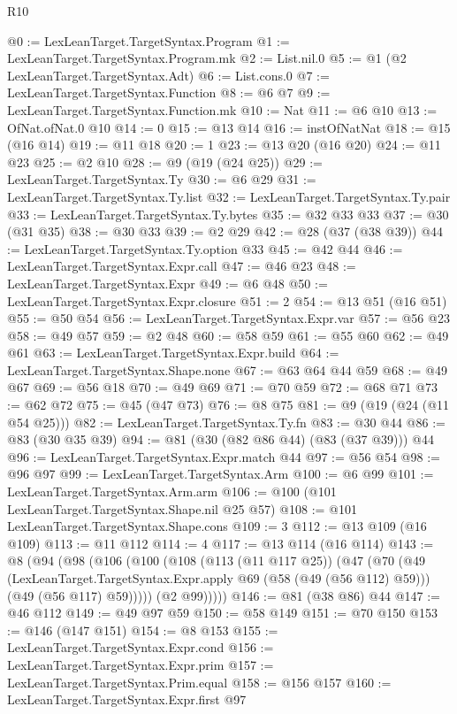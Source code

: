\begin{lexlean}{R10}
\begin{coremodule}
{{{{{{{{{@0 := LexLeanTarget.TargetSyntax.Program
@1 := LexLeanTarget.TargetSyntax.Program.mk
@2 := List.nil.{0}
@5 := @1 (@2 LexLeanTarget.TargetSyntax.Adt)
@6 := List.cons.{0}
@7 := LexLeanTarget.TargetSyntax.Function
@8 := @6 @7
@9 := LexLeanTarget.TargetSyntax.Function.mk
@10 := Nat
@11 := @6 @10
@13 := OfNat.ofNat.{0} @10
@14 := 0
@15 := @13 @14
@16 := instOfNatNat
@18 := @15 (@16 @14)
@19 := @11 @18
@20 := 1
@23 := @13 @20 (@16 @20)
@24 := @11 @23
@25 := @2 @10
@28 := @9 (@19 (@24 @25))
@29 := LexLeanTarget.TargetSyntax.Ty
@30 := @6 @29
@31 := LexLeanTarget.TargetSyntax.Ty.list
@32 := LexLeanTarget.TargetSyntax.Ty.pair
@33 := LexLeanTarget.TargetSyntax.Ty.bytes
@35 := @32 @33 @33
@37 := @30 (@31 @35)
@38 := @30 @33
@39 := @2 @29
@42 := @28 (@37 (@38 @39))
@44 := LexLeanTarget.TargetSyntax.Ty.option @33
@45 := @42 @44
@46 := LexLeanTarget.TargetSyntax.Expr.call
@47 := @46 @23
@48 := LexLeanTarget.TargetSyntax.Expr
@49 := @6 @48
@50 := LexLeanTarget.TargetSyntax.Expr.closure
@51 := 2
@54 := @13 @51 (@16 @51)
@55 := @50 @54
@56 := LexLeanTarget.TargetSyntax.Expr.var
@57 := @56 @23
@58 := @49 @57
@59 := @2 @48
@60 := @58 @59
@61 := @55 @60
@62 := @49 @61
@63 := LexLeanTarget.TargetSyntax.Expr.build
@64 := LexLeanTarget.TargetSyntax.Shape.none
@67 := @63 @64 @44 @59
@68 := @49 @67
@69 := @56 @18
@70 := @49 @69
@71 := @70 @59
@72 := @68 @71
@73 := @62 @72
@75 := @45 (@47 @73)
@76 := @8 @75
@81 := @9 (@19 (@24 (@11 @54 @25)))
@82 := LexLeanTarget.TargetSyntax.Ty.fn
@83 := @30 @44
@86 := @83 (@30 @35 @39)
@94 := @81 (@30 (@82 @86 @44) (@83 (@37 @39))) @44
@96 := LexLeanTarget.TargetSyntax.Expr.match @44
@97 := @56 @54
@98 := @96 @97
@99 := LexLeanTarget.TargetSyntax.Arm
@100 := @6 @99
@101 := LexLeanTarget.TargetSyntax.Arm.arm
@106 := @100 (@101 LexLeanTarget.TargetSyntax.Shape.nil @25 @57)
@108 := @101 LexLeanTarget.TargetSyntax.Shape.cons
@109 := 3
@112 := @13 @109 (@16 @109)
@113 := @11 @112
@114 := 4
@117 := @13 @114 (@16 @114)
@143 := @8
    (@94
      (@98
        (@106
          (@100
            (@108
              (@113 (@11 @117 @25))
              (@47
                (@70
                  (@49
                    (LexLeanTarget.TargetSyntax.Expr.apply @69 (@58 (@49 (@56 @112) @59)))
                    (@49 (@56 @117) @59)))))
            (@2 @99)))))
@146 := @81 (@38 @86) @44
@147 := @46 @112
@149 := @49 @97 @59
@150 := @58 @149
@151 := @70 @150
@153 := @146 (@147 @151)
@154 := @8 @153
@155 := LexLeanTarget.TargetSyntax.Expr.cond
@156 := LexLeanTarget.TargetSyntax.Expr.prim
@157 := LexLeanTarget.TargetSyntax.Prim.equal
@158 := @156 @157
@160 := LexLeanTarget.TargetSyntax.Expr.first @97
}}}}}}}}}
\end{coremodule}
\end{lexlean}
